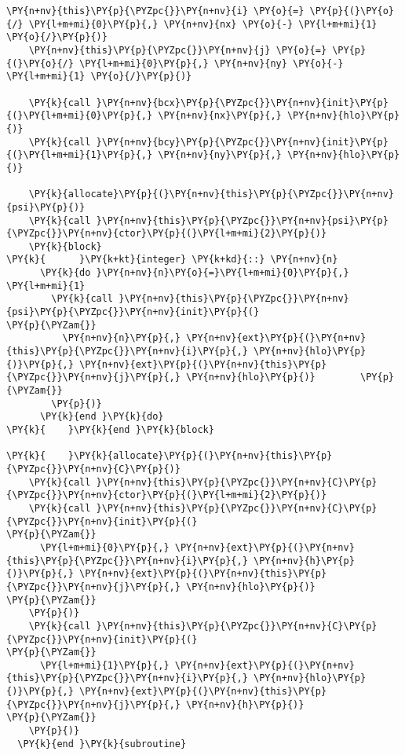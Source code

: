 \begin{Verbatim}[commandchars=\\\{\}]
    \PY{n+nv}{this}\PY{p}{\PYZpc{}}\PY{n+nv}{i} \PY{o}{=} \PY{p}{(}\PY{o}{/} \PY{l+m+mi}{0}\PY{p}{,} \PY{n+nv}{nx} \PY{o}{-} \PY{l+m+mi}{1} \PY{o}{/}\PY{p}{)}
    \PY{n+nv}{this}\PY{p}{\PYZpc{}}\PY{n+nv}{j} \PY{o}{=} \PY{p}{(}\PY{o}{/} \PY{l+m+mi}{0}\PY{p}{,} \PY{n+nv}{ny} \PY{o}{-} \PY{l+m+mi}{1} \PY{o}{/}\PY{p}{)}

    \PY{k}{call }\PY{n+nv}{bcx}\PY{p}{\PYZpc{}}\PY{n+nv}{init}\PY{p}{(}\PY{l+m+mi}{0}\PY{p}{,} \PY{n+nv}{nx}\PY{p}{,} \PY{n+nv}{hlo}\PY{p}{)}
    \PY{k}{call }\PY{n+nv}{bcy}\PY{p}{\PYZpc{}}\PY{n+nv}{init}\PY{p}{(}\PY{l+m+mi}{1}\PY{p}{,} \PY{n+nv}{ny}\PY{p}{,} \PY{n+nv}{hlo}\PY{p}{)}

    \PY{k}{allocate}\PY{p}{(}\PY{n+nv}{this}\PY{p}{\PYZpc{}}\PY{n+nv}{psi}\PY{p}{)}
    \PY{k}{call }\PY{n+nv}{this}\PY{p}{\PYZpc{}}\PY{n+nv}{psi}\PY{p}{\PYZpc{}}\PY{n+nv}{ctor}\PY{p}{(}\PY{l+m+mi}{2}\PY{p}{)}
    \PY{k}{block}
\PY{k}{      }\PY{k+kt}{integer} \PY{k+kd}{::} \PY{n+nv}{n}
      \PY{k}{do }\PY{n+nv}{n}\PY{o}{=}\PY{l+m+mi}{0}\PY{p}{,} \PY{l+m+mi}{1}
        \PY{k}{call }\PY{n+nv}{this}\PY{p}{\PYZpc{}}\PY{n+nv}{psi}\PY{p}{\PYZpc{}}\PY{n+nv}{init}\PY{p}{(}                            \PY{p}{\PYZam{}}
          \PY{n+nv}{n}\PY{p}{,} \PY{n+nv}{ext}\PY{p}{(}\PY{n+nv}{this}\PY{p}{\PYZpc{}}\PY{n+nv}{i}\PY{p}{,} \PY{n+nv}{hlo}\PY{p}{)}\PY{p}{,} \PY{n+nv}{ext}\PY{p}{(}\PY{n+nv}{this}\PY{p}{\PYZpc{}}\PY{n+nv}{j}\PY{p}{,} \PY{n+nv}{hlo}\PY{p}{)}        \PY{p}{\PYZam{}}
        \PY{p}{)}
      \PY{k}{end }\PY{k}{do}
\PY{k}{    }\PY{k}{end }\PY{k}{block}

\PY{k}{    }\PY{k}{allocate}\PY{p}{(}\PY{n+nv}{this}\PY{p}{\PYZpc{}}\PY{n+nv}{C}\PY{p}{)}
    \PY{k}{call }\PY{n+nv}{this}\PY{p}{\PYZpc{}}\PY{n+nv}{C}\PY{p}{\PYZpc{}}\PY{n+nv}{ctor}\PY{p}{(}\PY{l+m+mi}{2}\PY{p}{)}
    \PY{k}{call }\PY{n+nv}{this}\PY{p}{\PYZpc{}}\PY{n+nv}{C}\PY{p}{\PYZpc{}}\PY{n+nv}{init}\PY{p}{(}                                  \PY{p}{\PYZam{}}
      \PY{l+m+mi}{0}\PY{p}{,} \PY{n+nv}{ext}\PY{p}{(}\PY{n+nv}{this}\PY{p}{\PYZpc{}}\PY{n+nv}{i}\PY{p}{,} \PY{n+nv}{h}\PY{p}{)}\PY{p}{,} \PY{n+nv}{ext}\PY{p}{(}\PY{n+nv}{this}\PY{p}{\PYZpc{}}\PY{n+nv}{j}\PY{p}{,} \PY{n+nv}{hlo}\PY{p}{)}              \PY{p}{\PYZam{}}
    \PY{p}{)}
    \PY{k}{call }\PY{n+nv}{this}\PY{p}{\PYZpc{}}\PY{n+nv}{C}\PY{p}{\PYZpc{}}\PY{n+nv}{init}\PY{p}{(}                                  \PY{p}{\PYZam{}}
      \PY{l+m+mi}{1}\PY{p}{,} \PY{n+nv}{ext}\PY{p}{(}\PY{n+nv}{this}\PY{p}{\PYZpc{}}\PY{n+nv}{i}\PY{p}{,} \PY{n+nv}{hlo}\PY{p}{)}\PY{p}{,} \PY{n+nv}{ext}\PY{p}{(}\PY{n+nv}{this}\PY{p}{\PYZpc{}}\PY{n+nv}{j}\PY{p}{,} \PY{n+nv}{h}\PY{p}{)}              \PY{p}{\PYZam{}}
    \PY{p}{)}
  \PY{k}{end }\PY{k}{subroutine}


\end{Verbatim}
